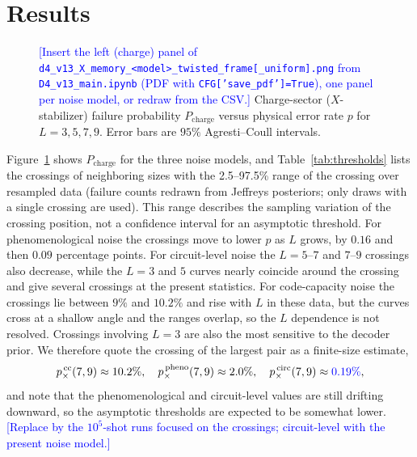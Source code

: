 \documentclass[a4paper]{article}
\newcommand{\blue}[1]{\textcolor{blue}{#1}}
\begin{document}
\section{Results}
\label{sec:results}

\begin{figure}[t]
  \centering
  \fbox{\rule{0pt}{50mm}\rule{0.82\linewidth}{0pt}}
  \caption{\blue{[Insert the left (charge) panel of \texttt{d4\_v13\_X\_memory\_<model>\_twisted\_frame[\_uniform].png} from \texttt{D4\_v13\_main.ipynb} (PDF with \texttt{CFG['save\_pdf']=True}), one panel per noise model, or redraw from the CSV.]} Charge-sector ($X$-stabilizer) failure probability $P_{\mathrm{charge}}$ versus physical error rate $p$ for $L=3,5,7,9$. Error bars are $95\%$ Agresti--Coull intervals.}
  \label{fig:threshold}
\end{figure}

Figure~\ref{fig:threshold} shows $P_{\mathrm{charge}}$ for the three noise models, and Table~\ref{tab:thresholds} lists the crossings of neighboring sizes with the 2.5--97.5\% range of the crossing over resampled data (failure counts redrawn from Jeffreys posteriors; only draws with a single crossing are used). This range describes the sampling variation of the crossing position, not a confidence interval for an asymptotic threshold. For phenomenological noise the crossings move to lower $p$ as $L$ grows, by $0.16$ and then $0.09$ percentage points. For circuit-level noise the $L=5$--$7$ and $7$--$9$ crossings also decrease, while the $L=3$ and $5$ curves nearly coincide around the crossing and give several crossings at the present statistics. For code-capacity noise the crossings lie between $9\%$ and $10.2\%$ and rise with $L$ in these data, but the curves cross at a shallow angle and the ranges overlap, so the $L$ dependence is not resolved. Crossings involving $L=3$ are also the most sensitive to the decoder prior. We therefore quote the crossing of the largest pair as a finite-size estimate,
\begin{equation}
  p_\times^{\,\mathrm{cc}}(7,9)\approx10.2\%,\quad
  p_\times^{\,\mathrm{pheno}}(7,9)\approx2.0\%,\quad
  p_\times^{\,\mathrm{circ}}(7,9)\approx\blue{0.19\%},
\end{equation}
and note that the phenomenological and circuit-level values are still drifting downward, so the asymptotic thresholds are expected to be somewhat lower. \blue{[Replace by the $10^5$-shot runs focused on the crossings; circuit-level with the present noise model.]}
\end{document}
